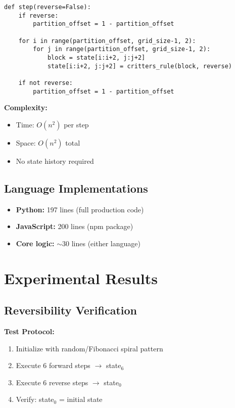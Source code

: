 \documentclass[11pt]{article}
\begin{document}
\begin{lstlisting}[caption={Minimal reversible CA implementation}]
def step(reverse=False):
    if reverse:
        partition_offset = 1 - partition_offset
    
    for i in range(partition_offset, grid_size-1, 2):
        for j in range(partition_offset, grid_size-1, 2):
            block = state[i:i+2, j:j+2]
            state[i:i+2, j:j+2] = critters_rule(block, reverse)
    
    if not reverse:
        partition_offset = 1 - partition_offset
\end{lstlisting}

\textbf{Complexity:}
\begin{itemize}
\item Time: $O(n^2)$ per step
\item Space: $O(n^2)$ total
\item No state history required
\end{itemize}

\subsection{Language Implementations}

\begin{itemize}
\item \textbf{Python:} 197 lines (full production code)
\item \textbf{JavaScript:} 200 lines (npm package)
\item \textbf{Core logic:} $\sim$30 lines (either language)
\end{itemize}

\section{Experimental Results}

\subsection{Reversibility Verification}

\textbf{Test Protocol:}
\begin{enumerate}
\item Initialize with random/Fibonacci spiral pattern
\item Execute 6 forward steps $\rightarrow$ state$_6$
\item Execute 6 reverse steps $\rightarrow$ state$_0$
\item Verify: state$_0$ = initial state
\end{enumerate}
\end{document}

